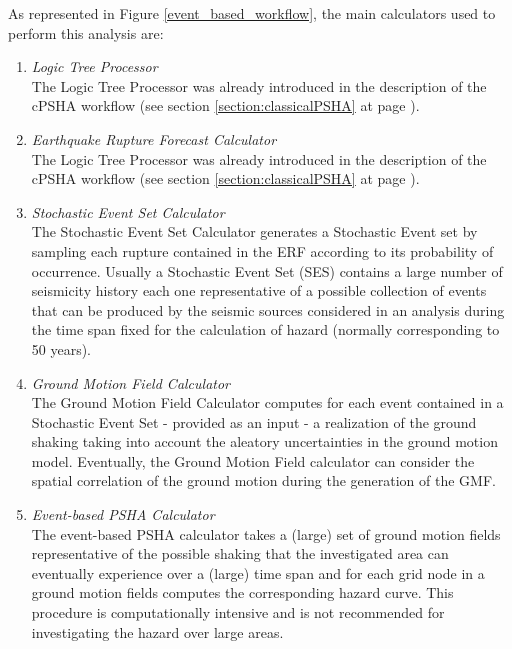 As represented in Figure \ref{event_based_workflow}, the main calculators 
used to perform this analysis are:
\begin{enumerate}
%
\item \emph{Logic Tree Processor} \hfill \\
The Logic Tree Processor was already 
introduced in the description of the cPSHA workflow (see section 
\ref{section:classicalPSHA} at page \pageref{section:classicalPSHA}).
%
\item \emph{Earthquake Rupture Forecast Calculator} \hfill \\ 
The Logic Tree Processor was already 
introduced in the description of the cPSHA workflow (see section 
\ref{section:classicalPSHA} at page \pageref{section:classicalPSHA}).
%
\item \emph{Stochastic Event Set Calculator} \hfill \\
The Stochastic Event Set Calculator generates a Stochastic Event set 
by sampling each rupture contained in the ERF according to its 
probability of occurrence. Usually a Stochastic Event Set (SES) contains
a large number of seismicity history each one representative of a  
possible collection of events that can be produced by the seismic sources
considered in an analysis during the time span fixed for the calculation
of hazard (normally corresponding to 50 years).
%
\item \emph{Ground Motion Field Calculator} \hfill \\
The Ground Motion Field Calculator computes for each event contained in a 
Stochastic Event Set - provided as an input - a realization of the 
ground shaking taking into account the aleatory uncertainties in 
the ground motion model. Eventually, the Ground Motion Field calculator 
can consider the spatial correlation of the ground motion during the 
generation of the GMF.
%
\item \emph{Event-based PSHA Calculator} \hfill \\
The event-based PSHA calculator takes a (large) set of ground motion 
fields representative of the possible shaking that the investigated 
area can eventually experience over a (large) time span and for each 
grid node in a ground motion fields computes the corresponding hazard 
curve. 
%
This procedure is computationally intensive and is not recommended for 
investigating the hazard over large areas. 
\end{enumerate}

